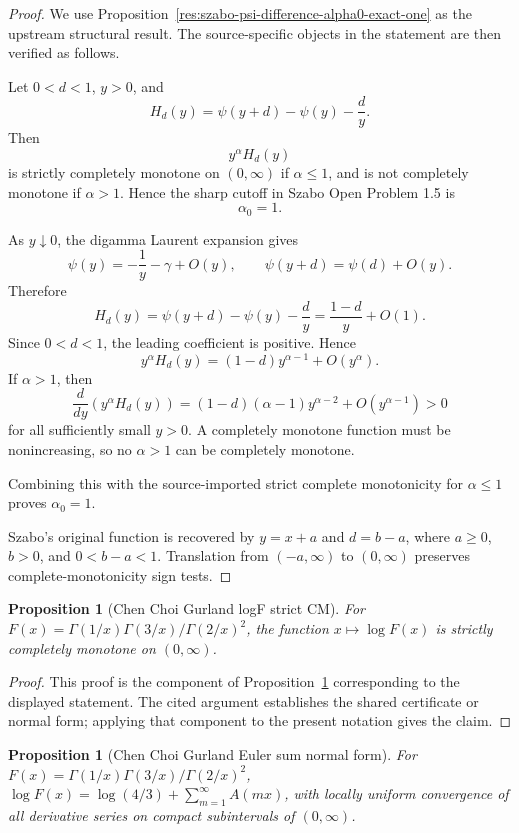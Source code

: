\documentclass[11pt]{article}
\numberwithin{equation}{section}
\newtheorem{proposition}[theorem]{Proposition}
\theoremstyle{definition}
\theoremstyle{remark}
\newcommand{\1}{\mathbf 1}
\begin{document}
\begin{proof}
We use Proposition~\ref{res:szabo-psi-difference-alpha0-exact-one} as the upstream structural result. The source-specific objects in the statement are then verified as follows.

Let \(0<d<1\), \(y>0\), and
\[
H_d(y)=\psi(y+d)-\psi(y)-\frac{d}{y}.
\]
Then
\[
y^\alpha H_d(y)
\]
is strictly completely monotone on \((0,\infty)\) if \(\alpha\le 1\), and is not completely monotone if \(\alpha>1\). Hence the sharp cutoff in Szabo Open Problem 1.5 is
\[
\alpha_0=1.
\]

As \(y\downarrow0\), the digamma Laurent expansion gives
\[
\psi(y)=-\frac1y-\gamma+O(y),
\qquad
\psi(y+d)=\psi(d)+O(y).
\]
Therefore
\[
H_d(y)=\psi(y+d)-\psi(y)-\frac{d}{y}
=\frac{1-d}{y}+O(1).
\]
Since \(0<d<1\), the leading coefficient is positive. Hence
\[
y^\alpha H_d(y)=(1-d)y^{\alpha-1}+O(y^\alpha).
\]
If \(\alpha>1\), then
\[
\frac{d}{dy}\left(y^\alpha H_d(y)\right)
=(1-d)(\alpha-1)y^{\alpha-2}+O(y^{\alpha-1})>0
\]
for all sufficiently small \(y>0\). A completely monotone function must be nonincreasing, so no \(\alpha>1\) can be completely monotone.

Combining this with the source-imported strict complete monotonicity for \(\alpha\le1\) proves \(\alpha_0=1\).

Szabo's original function is recovered by \(y=x+a\) and \(d=b-a\), where \(a\ge0\), \(b>0\), and \(0<b-a<1\). Translation from \((-a,\infty)\) to \((0,\infty)\) preserves complete-monotonicity sign tests.
\end{proof}

\begin{proposition}[Chen Choi Gurland logF strict CM]
\label{res:chen-choi-gurland-logf-strict-cm}
For \(F(x)=\Gamma(1/x)\Gamma(3/x)/\Gamma(2/x)^2\), the function \(x\mapsto\log F(x)\) is strictly completely monotone on \((0,\infty)\).
\end{proposition}

\begin{proof}
This proof is the component of Proposition~\ref{res:chen-choi-gurland-euler-sum-normal-form} corresponding to the displayed statement.  The cited argument establishes the shared certificate or normal form; applying that component to the present notation gives the claim.
\end{proof}

\begin{proposition}[Chen Choi Gurland Euler sum normal form]
\label{res:chen-choi-gurland-euler-sum-normal-form}
For \(F(x)=\Gamma(1/x)\Gamma(3/x)/\Gamma(2/x)^2\), \(\log F(x)=\log(4/3)+\sum_{m=1}^{\infty}A(mx)\), with locally uniform convergence of all derivative series on compact subintervals of \((0,\infty)\).
\end{proposition}
\end{document}

